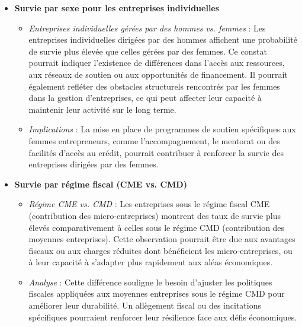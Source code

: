 \documentclass[a4paper,12pt]{report}
\begin{document}
\begin{itemize}
    \item \textbf{Survie par sexe pour les entreprises individuelles}
    \begin{itemize}
        \item \textit{Entreprises individuelles gérées par des hommes vs. femmes} : Les entreprises individuelles dirigées par des hommes affichent une probabilité de survie plus élevée que celles gérées par des femmes. Ce constat pourrait indiquer l’existence de différences dans l’accès aux ressources, aux réseaux de soutien ou aux opportunités de financement. Il pourrait également refléter des obstacles structurels rencontrés par les femmes dans la gestion d'entreprises, ce qui peut affecter leur capacité à maintenir leur activité sur le long terme.
        \item \textit{Implications} : La mise en place de programmes de soutien spécifiques aux femmes entrepreneurs, comme l’accompagnement, le mentorat ou des facilités d’accès au crédit, pourrait contribuer à renforcer la survie des entreprises dirigées par des femmes.
    \end{itemize}
    
    \item \textbf{Survie par régime fiscal (CME vs. CMD)}
    \begin{itemize}
        \item \textit{Régime CME vs. CMD} : Les entreprises sous le régime fiscal CME (contribution des micro-entreprises) montrent des taux de survie plus élevés comparativement à celles sous le régime CMD (contribution des moyennes entreprises). Cette observation pourrait être due aux avantages fiscaux ou aux charges réduites dont bénéficient les micro-entreprises, ou à leur capacité à s’adapter plus rapidement aux aléas économiques.
        \item \textit{Analyse} : Cette différence souligne le besoin d’ajuster les politiques fiscales appliquées aux moyennes entreprises sous le régime CMD pour améliorer leur durabilité. Un allègement fiscal ou des incitations spécifiques pourraient renforcer leur résilience face aux défis économiques.
    \end{itemize}


\end{itemize}
\end{document}
